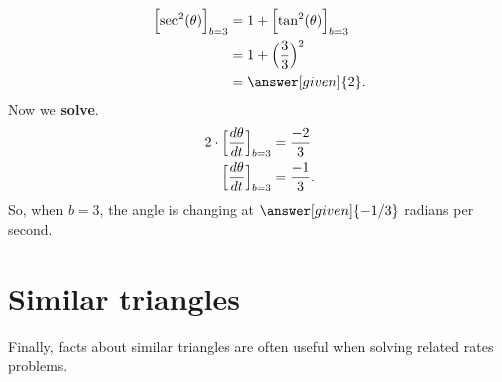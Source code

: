 \documentclass{ximera}
\begin{document}
\begin{example}
\begin{explanation}
    \begin{align*}
     \Bigl[\sec^2(\theta)\Bigr]_{b=3} &= 1+ \Bigl[\tan^2(\theta)\Bigr]_{b=3}\\
      &= 1+\Bigl(\frac{3}{3}\Bigr)^2\\
      &= \answer[given]{2}.
    \end{align*}
   Now we \textbf{solve}.
    \begin{align*}
      2\cdot \Bigl[\dfrac{d\theta}{dt}\Bigr]_{b=3}  &= \frac{-2}{3}\\
     \Bigl[\dfrac{d\theta}{dt}\Bigr]_{b=3} &= \frac{-1}{3}.
    \end{align*}
    So, when $b=3$, the angle is changing at $\answer[given]{-1/3}$
    radians per second.
  \end{explanation}
\end{example}



\section{Similar triangles}

Finally, facts about similar triangles are often useful when solving
related rates problems.
\end{document}
